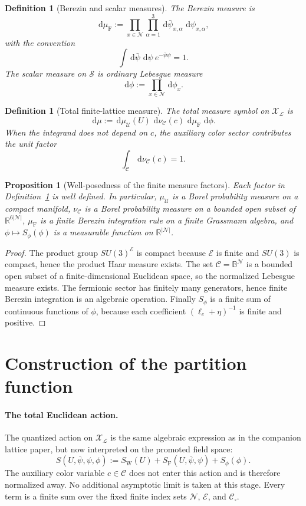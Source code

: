 \documentclass[11pt]{article}
\newtheorem{definition}[theorem]{Definition}
\newtheorem{proposition}[theorem]{Proposition}
\theoremstyle{remark}
\newcommand{\R}{\mathbb R}
\newcommand{\mcN}{\mathcal N}
\newcommand{\mcE}{\mathcal E}
\newcommand{\mcU}{\mathscr U}
\newcommand{\mcCaux}{\mathscr C}
\newcommand{\mcS}{\mathscr S}
\newcommand{\mcX}{\mathscr X}
\newcommand{\bbB}{\mathbb B}
\newcommand{\dd}{\,\mathrm d}
\begin{document}
\begin{definition}[Berezin and scalar measures]
\label{def:berezin}
The Berezin measure is
\[
\dd\mu_{\mathrm F}:=
\prod_{x\in\mcN}\prod_{\alpha=1}^3
\dd\bar\psi_{x,\alpha}\,\dd\psi_{x,\alpha},
\]
with the convention
\[
\int \dd\bar\psi\,\dd\psi\ e^{-\bar\psi\psi}=1.
\]
The scalar measure on $\mcS$ is ordinary Lebesgue measure
\[
\dd\phi:=\prod_{x\in\mcN}\dd\phi_x.
\]
\end{definition}

\begin{definition}[Total finite-lattice measure]
\label{def:total-measure}
The total measure symbol on $\mcX_\mathcal L$ is
\[
\dd\mu:=
\dd\mu_{\mcU}(U)\,\dd\nu_{\mcCaux}(c)\,\dd\mu_{\mathrm F}\,\dd\phi.
\]
When the integrand does not depend on $c$, the auxiliary color sector
contributes the unit factor
\[
\int_{\mcCaux}\dd\nu_{\mcCaux}(c)=1.
\]
\end{definition}

\begin{proposition}[Well-posedness of the finite measure factors]
\label{prop:measure-wellposed}
Each factor in Definition~\ref{def:total-measure} is well defined.  In
particular, $\mu_{\mcU}$ is a Borel probability measure on a compact manifold,
$\nu_{\mcCaux}$ is a Borel probability measure on a bounded open subset of
$\R^{6|\mcN|}$, $\mu_{\mathrm F}$ is a finite Berezin integration rule on a
finite Grassmann algebra, and $\phi\mapsto S_\phi(\phi)$ is a measurable
function on $\R^{|\mcN|}$.
\end{proposition}
\begin{proof}
The product group $SU(3)^{\mcE}$ is compact because $\mcE$ is finite and
$SU(3)$ is compact, hence the product Haar measure exists.  The set
$\mcCaux=\bbB^{\mcN}$ is a bounded open subset of a finite-dimensional Euclidean
space, so the normalized Lebesgue measure exists.  The fermionic sector has
finitely many generators, hence finite Berezin integration is an algebraic
operation.  Finally $S_\phi$ is a finite sum of continuous functions of
$\phi$, because each coefficient $(\ell_e+\eta)^{-1}$ is finite and positive.
\end{proof}

\section{Construction of the partition function}
\label{sec:partition}

\paragraph{The total Euclidean action.}
The quantized action on $\mcX_\mathcal L$ is the same algebraic expression as
in the companion lattice paper, but now interpreted on the promoted field
space:
\[
S(U,\bar\psi,\psi,\phi)
:=
S_{\mathrm W}(U)+S_{\mathrm F}(U,\bar\psi,\psi)+S_\phi(\phi).
\]
The auxiliary color variable $c\in\mcCaux$ does not enter this action and is
therefore normalized away.  No additional asymptotic limit is taken at this stage.
Every term is a finite sum over the fixed finite index sets $\mcN$, $\mcE$, and
$\mathcal C_\square$.
\end{document}
